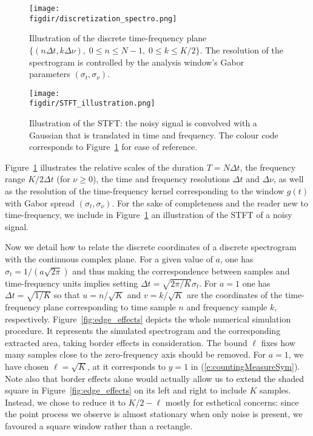 \begin{figure}
\begin{center}
	\texttt{[image: \\figdir/discretization\_spectro.png]}
	\caption{\label{fig_discrete} Illustration of the discrete time-frequency plane $\{(n\Delta t, k\Delta \nu),\; 0\leq n\leq N-1,\; 0\leq k\leq K/2\}$. The resolution of the spectrogram is controlled by the analysis window's Gabor parameters $(\sigma_t, \sigma_\nu)$.}
\end{center}
\end{figure}
\begin{figure}
	\centering
	\texttt{[image: \\figdir/STFT\_illustration.png]}
\caption{\label{fig_stft} Illustration of the STFT: the noisy signal is convolved with a Gaussian
that is translated in time and frequency. The colour code corresponds to
Figure~\ref{fig_discrete} for ease of reference.}
\end{figure}{}

Figure~\ref{fig_discrete} illustrates the relative scales of the duration $T =
N\Delta t$, the frequency range $K/2\Delta t$ (for $\nu\geq 0$), the time and
frequency resolutions $\Delta t$ and $\Delta \nu$, as well as the resolution of
the time-frequency kernel corresponding to the window $g(t)$ with Gabor spread
$(\sigma_t, \sigma_\nu)$. For the sake of completeness and the reader new to
time-frequency, we include in Figure~\ref{fig_discrete} an illustration of the
STFT of a noisy signal.

Now we detail how to relate the discrete coordinates of a discrete spectrogram
with the continuous complex plane. For a given value of $a$, one has
$\sigma_t=1/(a\sqrt{2\pi})$ and thus making the correspondence between samples
and time-frequency units implies setting $\Delta t = \sqrt{2\pi/K}\sigma_t$. For
$a = 1$ one has $\Delta t = \sqrt{1/K}$ so that $u = n/\sqrt{K}$ and $v =
k/\sqrt{K}$ are the coordinates of the time-frequency plane corresponding to
time sample $n$ and frequency sample $k$, respectively.
Figure~\ref{fig:edge_effects} depicts the whole numerical simulation procedure.
It represents the simulated spectrogram and the corresponding extracted area,
taking border effects in consideration. The bound $\ell$ fixes how many samples
close to the zero-frequency axis should be removed. For $a=1$, we have chosen
$\ell = \sqrt{K}$, at it corresponds to $y = 1$ in (\ref{e:countingMeasureSym}).
Note also that border effects alone would actually allow us to extend the shaded
square in Figure~\ref{fig:edge_effects} on its left and right to include $K$
samples. Instead, we chose to reduce it to $K/2-\ell$ mostly for esthetical concerns:
since the point process we observe is almost stationary when only noise is
present, we favoured a square window rather than a rectangle.

